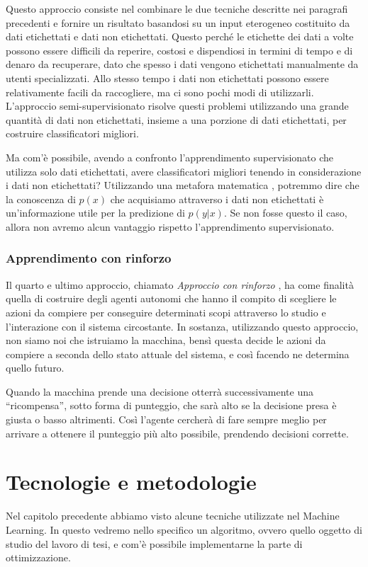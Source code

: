 \documentclass[a4paper,12pt]{report}
\begin{document}
Questo approccio consiste nel combinare le due tecniche descritte nei paragrafi precedenti e fornire un risultato basandosi su un input eterogeneo costituito da dati etichettati e dati non etichettati.
Questo perché le etichette dei dati a volte possono essere difficili da reperire, costosi e dispendiosi in termini di tempo e di denaro da recuperare, dato che spesso i dati vengono etichettati manualmente da utenti specializzati. Allo stesso tempo i dati non etichettati possono essere relativamente facili da raccogliere, ma ci sono pochi modi di utilizzarli. 
L'approccio semi-supervisionato risolve questi problemi utilizzando una grande quantità di dati non etichettati, insieme a una porzione di dati etichettati, per costruire classificatori migliori. 

Ma com'è possibile, avendo a confronto l'apprendimento supervisionato che utilizza solo dati etichettati, avere classificatori migliori tenendo in considerazione i dati non etichettati?
Utilizzando una metafora matematica \cite{supervisedlearning}, potremmo dire che la conoscenza di $p(x)$ che acquisiamo attraverso i dati non etichettati è un'informazione utile per la predizione di $p(y|x)$. Se non fosse questo il caso, allora non avremo alcun vantaggio rispetto l'apprendimento supervisionato.

\subsection*{Apprendimento con rinforzo}
Il quarto e ultimo approccio, chiamato \textit{Approccio con rinforzo} \cite{Reinforcement_learning}, ha come finalità quella di costruire degli agenti autonomi che hanno il compito di scegliere le azioni da compiere per conseguire determinati scopi attraverso lo studio e l'interazione con il sistema circostante.
In sostanza, utilizzando questo approccio, non siamo noi che istruiamo la macchina, bensì questa decide le azioni da compiere a seconda dello stato attuale del sistema, e così facendo ne determina quello futuro.

Quando la macchina prende una decisione otterrà successivamente una “ricompensa”, sotto forma di punteggio, che sarà alto se la decisione presa è giusta o basso altrimenti. Così l'agente cercherà di fare sempre meglio per arrivare a ottenere il punteggio più alto possibile, prendendo decisioni corrette.

\chapter{Tecnologie e metodologie}
\label{Capitolo 2}
Nel capitolo precedente abbiamo visto alcune tecniche utilizzate nel Machine Learning. In questo vedremo nello specifico un algoritmo, ovvero quello oggetto di studio del lavoro di tesi, e com'è possibile implementarne la parte di ottimizzazione.
\end{document}
